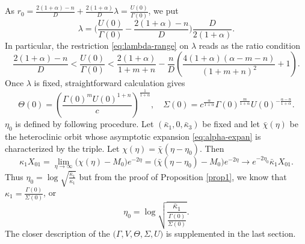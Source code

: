 \documentclass[a4paper,11pt]{article}
\begin{document}
As $r_0 = \frac{2(1+\alpha)-n}{D} + \frac{2(1+\alpha)}{D}\lambda = \frac{U(0)}{\Gamma(0)}$, 
we put
\begin{equation}
 \lambda = \Big(\frac{U(0)}{\Gamma(0)} - \frac{2(1+\alpha)-n}{D}\Big)\frac{D}{2(1+\alpha)}.
\end{equation}
In particular, the restriction \eqref{eq:lambda-range} on $\lambda$ reads as the ratio condition
\begin{equation} \label{eq:restriction}
 \frac{2(1+\alpha) -n}{D} < \frac{U(0)}{\Gamma(0)} < \frac{2(1+\alpha)}{1+m+n} -\frac{n}{D}\left( \frac{4(1+\alpha)(\alpha-m-n)}{(1+m+n)^2} +1\right).
\end{equation}
Once $\lambda$ is fixed, straightforward calculation gives
$$\Theta(0) = \left(\frac{\Gamma(0)^m U(0)^{1+n}}{c}\right)^{\frac{1}{1+\alpha}}, \quad \Sigma(0) = c^{\frac{\alpha}{1+\alpha}}\Gamma(0)^{\frac{m}{1+\alpha}} U(0)^{-\frac{\alpha-n}{1+\alpha}}.$$
$\eta_0$ is defined by following procedure. Let $(\bar\kappa_1,0,\bar\kappa_3)$ be fixed and let $\bar\chi(\eta)$ be the heteroclinic orbit whose asymptotic expansion \eqref{eq:alpha-expan} is characterized by the triple. Let $\chi(\eta) = \bar\chi(\eta-\eta_0)$. Then 
$$\kappa_1 X_{01}=\lim_{\eta \rightarrow \infty}\big(\chi(\eta) - M_0\big)e^{-2\eta} = \big(\bar\chi(\eta-\eta_0) - M_0\big)e^{-2\eta} \rightarrow e^{-2\eta_0}\bar\kappa_1 X_{01}.$$
Thus $\eta_0 = \log\sqrt{\frac{\bar\kappa_1}{\kappa_1}}$ but from the proof of Proposition \ref{prop1}, we know that
$\kappa_1 = \frac{\Gamma(0)}{\Sigma(0)}$, or
\begin{equation}
 \eta_0 = \log \sqrt{\frac{\bar\kappa_1}{\frac{\Gamma(0)}{\Sigma(0)}}}.
\end{equation}
The closer description of the $\big(\Gamma,V,\Theta,\Sigma,U\big)$ is supplemented in the last section.
\end{document}
